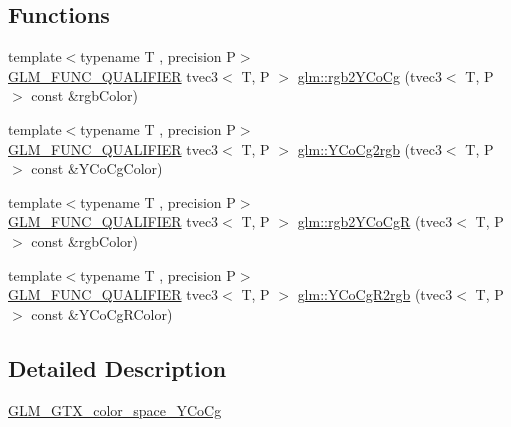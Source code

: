 \subsection*{Functions}
\begin{DoxyCompactItemize}
\item 
{\footnotesize template$<$typename T , precision P$>$ }\\\mbox{\hyperlink{setup_8hpp_a33fdea6f91c5f834105f7415e2a64407}{G\+L\+M\+\_\+\+F\+U\+N\+C\+\_\+\+Q\+U\+A\+L\+I\+F\+I\+ER}} tvec3$<$ T, P $>$ \mbox{\hyperlink{group__gtx__color__space___y_co_cg_ga19481f6947c5b5482debd41e71b8c941}{glm\+::rgb2\+Y\+Co\+Cg}} (tvec3$<$ T, P $>$ const \&rgb\+Color)
\item 
{\footnotesize template$<$typename T , precision P$>$ }\\\mbox{\hyperlink{setup_8hpp_a33fdea6f91c5f834105f7415e2a64407}{G\+L\+M\+\_\+\+F\+U\+N\+C\+\_\+\+Q\+U\+A\+L\+I\+F\+I\+ER}} tvec3$<$ T, P $>$ \mbox{\hyperlink{group__gtx__color__space___y_co_cg_ga6d7e988a79b299ca1fa59f537e13800b}{glm\+::\+Y\+Co\+Cg2rgb}} (tvec3$<$ T, P $>$ const \&Y\+Co\+Cg\+Color)
\item 
{\footnotesize template$<$typename T , precision P$>$ }\\\mbox{\hyperlink{setup_8hpp_a33fdea6f91c5f834105f7415e2a64407}{G\+L\+M\+\_\+\+F\+U\+N\+C\+\_\+\+Q\+U\+A\+L\+I\+F\+I\+ER}} tvec3$<$ T, P $>$ \mbox{\hyperlink{group__gtx__color__space___y_co_cg_ga2e534594cc8ad252d23b14fb363ae9e2}{glm\+::rgb2\+Y\+Co\+CgR}} (tvec3$<$ T, P $>$ const \&rgb\+Color)
\item 
{\footnotesize template$<$typename T , precision P$>$ }\\\mbox{\hyperlink{setup_8hpp_a33fdea6f91c5f834105f7415e2a64407}{G\+L\+M\+\_\+\+F\+U\+N\+C\+\_\+\+Q\+U\+A\+L\+I\+F\+I\+ER}} tvec3$<$ T, P $>$ \mbox{\hyperlink{group__gtx__color__space___y_co_cg_ga4bac5462c00df0ae89242ecdbbe5dbad}{glm\+::\+Y\+Co\+Cg\+R2rgb}} (tvec3$<$ T, P $>$ const \&Y\+Co\+Cg\+R\+Color)
\end{DoxyCompactItemize}


\subsection{Detailed Description}
\mbox{\hyperlink{group__gtx__color__space___y_co_cg}{G\+L\+M\+\_\+\+G\+T\+X\+\_\+color\+\_\+space\+\_\+\+Y\+Co\+Cg}} 